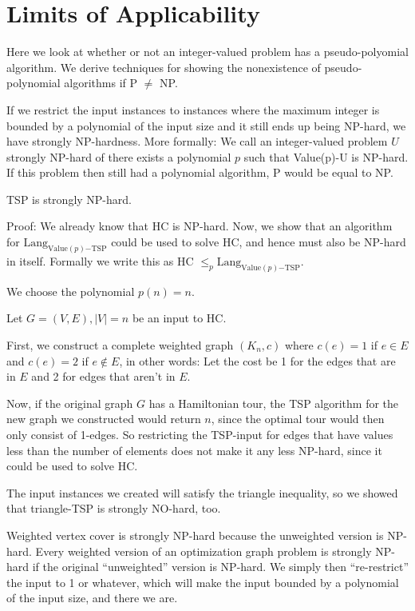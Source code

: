 \documentclass{book}
\begin{document}
\section{Limits of Applicability}
Here we look at whether or not an integer-valued problem has a pseudo-polyomial algorithm. We derive techniques for showing the nonexistence of pseudo-polynomial algorithms if P $\neq$ NP.

If we restrict the input instances to instances where the maximum integer is bounded by a polynomial of the input size and it still ends up being NP-hard, we have strongly NP-hardness. More formally: We call an integer-valued problem $U$ strongly NP-hard of there exists a polynomial $p$ such that Value(p)-U is NP-hard. If this problem then still had a polynomial algorithm, P would be equal to NP.

TSP is strongly NP-hard.

Proof: We already know that HC is NP-hard. Now, we show that an algorithm for $\mathrm{Lang}_{\mathrm{Value}(p)\mathrm{-TSP}}$ could be used to solve HC, and hence must also be NP-hard in itself. Formally we write this as HC $\leq_p \mathrm{Lang}_{\mathrm{Value}(p)\mathrm{-TSP}}$.

We choose the polynomial $p(n) = n$. 

Let $G=(V,E), |V|=n$ be an input to HC.

First, we construct a complete weighted graph $(K_n,c)$ where $c(e) = 1$ if $e \in E$ and $c(e) = 2$ if $e \notin E$, in other words: Let the cost be 1 for the edges that are in $E$ and 2 for edges that aren't in $E$.

Now, if the original graph $G$ has a Hamiltonian tour, the TSP algorithm for the new graph we constructed would return $n$, since the optimal tour would then only consist of 1-edges. So restricting the TSP-input for edges that have values less than the number of elements does not make it any less NP-hard, since it could be used to solve HC.

The input instances we created will satisfy the triangle inequality, so we showed that triangle-TSP is strongly NO-hard, too.

Weighted vertex cover is strongly NP-hard because the unweighted version is NP-hard. Every weighted version of an optimization graph problem is strongly NP-hard if the original ``unweighted'' version is NP-hard. We simply then ``re-restrict'' the input to 1 or whatever, which will make the input bounded by a polynomial of the input size, and there we are.
\end{document}
